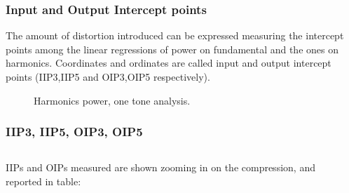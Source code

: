 \begin{frame}
\frametitle{Input and Output Intercept points}
The amount of distortion introduced can be expressed measuring the intercept points among the linear regressions of power on fundamental and the ones on harmonics. Coordinates and ordinates are called input and output intercept points (IIP3,IIP5 and OIP3,OIP5 respectively).
\begin{figure}[H] 
	\centering
	\caption{Harmonics power, one tone analysis.}
	\label{fig:IIP3_1t_schem}
\end{figure}
\end{frame}

\begin{frame}
\frametitle{IIP3, IIP5, OIP3, OIP5}
\begin{columns}
	IIPs and OIPs measured are shown zooming in on the compression, and reported in table:
	\begin{table}[H]
		\label{tab:IIP3_1tone}
		\centering	
	\end{table}
	\end{columns}
	\begin{figure}[H] 
		\centering
		\label{fig:IIP3_1t_schem}
	\end{figure}
\end{frame}


